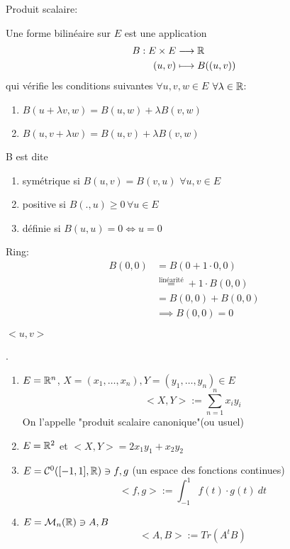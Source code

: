 \documentclass[a4paper]{report}
\begin{document}
Produit scalaire:
\begin{definition}
    Une forme bilinéaire sur $E$ est une application  
    \begin{align*}
        B: E \times E &\longrightarrow \mathbb{R} \\
        (u, v) &\longmapsto B((u, v))
    \end{align*}
    qui vérifie les conditions suivantes $\forall u, v, w \in E$ $\forall \lambda \in \mathbb{R}$:
    \begin{enumerate}
        \item $B(u + \lambda v, w) = B(u, w) + \lambda B(v, w)$
        \item  $B(u, v + \lambda w) = B(u, v) + \lambda B(v, w)$
    \end{enumerate}
    B est dite 
    \begin{enumerate}
        \item symétrique si $B(u, v) = B(v, u)$  $\forall u, v \in E$
        \item positive si $B(., u) \ge 0 \, \forall u \in E$
        \item définie si $B(u, u) = 0 \iff u = 0$
    \end{enumerate}
\end{definition}
Ring: 
\begin{align*}
    B(0, 0) &= B(0 + 1 \cdot 0, 0)\\
            &\overset{\text{linéarité}}{=} + 1 \cdot B(0, 0) \\
            &= B(0,0) + B(0, 0)\\
            & \implies B(0, 0) = 0
\end{align*}
\begin{notation}
   $<u, v>$ 
\end{notation}
\begin{eg}.
   \begin{enumerate}
       \item $E = \mathbb{R}^n$,  $X = (x_1, \ldots, x_n), Y = (y_1, \ldots, y_n) \in E$\\
           \[
               <X, Y> := \sum_{n=1}^{n} x_iy_i
           \] 
           On l'appelle "produit scalaire canonique"(ou usuel)
        \item $E = \mathbb{R}^2$ et  $<X, Y> = 2x_1y_1 + x_2y_2$
        \item $E = \mathcal{C}^0([-1, 1], \mathbb{R}) \ni f, g$ (un espace des fonctions continues)
            \[
                <f, g> := \int_{-1}^{1} f(t) \cdot g(t) \: d{t} 
            \] 
        \item $E = \mathcal{M}_n(\mathbb{R}) \ni A, B$
             \[
            <A, B> := Tr(A^tB)
            \] 
   \end{enumerate} 
\end{eg}
\end{document}
